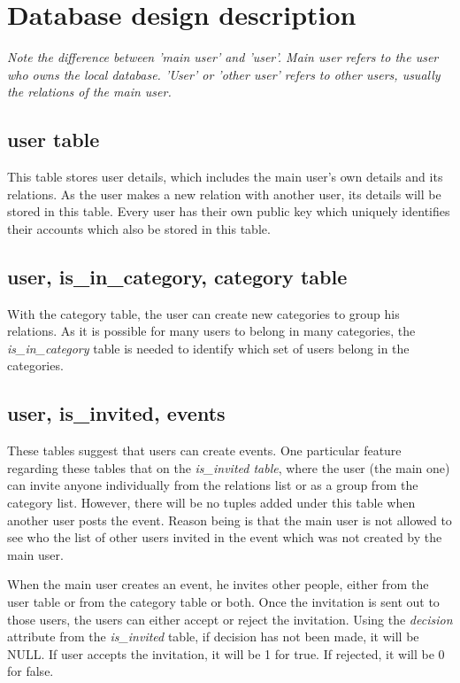 \section{Database design description}
{\it Note the difference between 'main user' and 'user'. Main user refers to the user who owns the local database. 'User' or 'other user' refers to other users, usually the relations of the main user.}
\subsection{user table} 
This table stores user details, which includes the main user's own details and its relations. As the user makes a new relation with another user, its details will be stored in this table. Every user has their own public key which uniquely identifies their accounts which also be stored in this table.

\subsection{user, is\_in\_category, category table}
With the category table, the user can create new categories to group his relations. As it is possible for many users to belong in many categories, the {\it is\_in\_category} table is needed to identify which set of users belong in the categories.

\subsection{user, is\_invited, events}
These tables suggest that users can create events. One particular feature regarding these tables that on the {\it is\_invited table}, where the user (the main one) can invite anyone individually from the relations list or as a group from the category list. However, there will be no tuples added under this table when another user posts the event. Reason being is that the main user is not allowed to see who the list of other users invited in the event which was not created by the main user. 

When the main user creates an event, he invites other people, either from the user table or from the category table or both. Once the invitation is sent out to those users, the users can either accept or reject the invitation. Using the {\it decision} attribute from the {\it is\_invited} table, if decision has not been made, it will be NULL. If user accepts the invitation, it will be 1 for true. If rejected, it will be 0 for false. 

